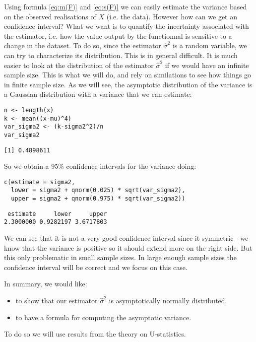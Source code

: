 \documentclass[12pt]{article}
\begin{document}
Using formula \eqref{eq:m(F)} and \eqref{eq:s(F)} we can easily estimate
the variance based on the observed realisations of \(X\) (i.e. the
data). However how can we get an confidence interval? What we want is
to quantify the incertainty associated with the estimator, i.e. how
the value output by the functionnal is sensitive to a change in the
dataset. To do so, since the estimator \(\hat{\sigma}^2\) is a random variable, we
can try to characterize its distribution. This is in general
difficult. It is much easier to look at the distribution of the
estimator \(\hat{\sigma}^2\) if we would have an infinite sample size. This is what
we will do, and rely on similations to see how things go in finite
sample size. As we will see, the asymptotic distribution of the
variance is a Gaussian distribution with a variance that we can estimate:
\lstset{language=r,label= ,caption= ,captionpos=b,numbers=none}
\begin{lstlisting}
n <- length(x)
k <- mean((x-mu)^4)
var_sigma2 <- (k-sigma2^2)/n
var_sigma2
\end{lstlisting}

\begin{verbatim}
[1] 0.4898611
\end{verbatim}

So we obtain a 95\% confidence intervals for the variance doing:
\lstset{language=r,label= ,caption= ,captionpos=b,numbers=none}
\begin{lstlisting}
c(estimate = sigma2, 
  lower = sigma2 + qnorm(0.025) * sqrt(var_sigma2),
  upper = sigma2 + qnorm(0.975) * sqrt(var_sigma2))
\end{lstlisting}

\begin{verbatim}
 estimate     lower     upper 
2.3000000 0.9282197 3.6717803
\end{verbatim}

We can see that it is not a very good confidence interval since it
symmetric - we know that the variance is positive so it should extend
more on the right side. But this only problematic in small sample
sizes. In large enough sample sizes the confidence interval will be
correct and we focus on this case.

\clearpage

In summary, we would like:
\begin{itemize}
\item to show that our estimator \(\hat{\sigma}^2\) is asymptotically normally distributed.
\item to have a formula for computing the asymptotic variance.
\end{itemize}
To do so we will use results from the theory on U-statistics.
\end{document}
